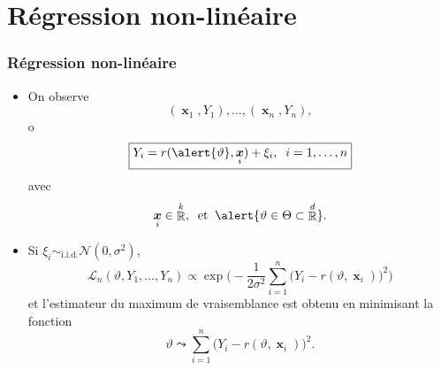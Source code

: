 \documentclass{beamer}
\newtheorem{prop}[theo]{Proposition}
\DeclareMathOperator{\E}{{\mathbb E}}
\DeclareMathOperator{\R}{{\mathbb R}}
\DeclareMathOperator{\bx}{\boldsymbol{x}}
\DeclareMathOperator{\estMC}{\widehat \vartheta_n^{\,\,{\tt mc}}}
\DeclareMathOperator{\design}{\mathbb{M}}
\begin{document}

%





\section{Régression non-linéaire}


\begin{frame}
\frametitle{Régression non-linéaire}
\begin{itemize}
\item On observe
$$(\bx_1,Y_1),\ldots, (\bx_n,Y_n),$$
o
$$\boxed{Y_i = r(\alert{\vartheta},\bx_i)+\xi_i,\;\;i=1,\ldots,n}$$
avec
$$\bx_i\in \R^k,\;\;\text{et}\;\; \alert{\vartheta \in \Theta \subset \R^d}.$$
\item Si $\xi_i \sim_{\text{i.i.d.}} {\mathcal N}(0,\sigma^2)$,
$${\mathcal L}_n(\vartheta, Y_1,\ldots, Y_n) \propto \exp\Big(-\frac{1}{2\sigma^2}\sum_{i = 1}^n\big(Y_i-r(\vartheta,\bx_i)\big)^2\Big)$$
et l'estimateur du \alert{maximum de vraisemblance} est obtenu en minimisant la fonction
$$\vartheta \leadsto \sum_{i = 1}^n\big(Y_i-r(\vartheta,\bx_i)\big)^2.$$
\end{itemize}
\end{frame}
\end{document}
